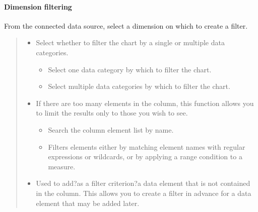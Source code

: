 \documentclass[letterpaper,10pt,english]{sphinxmanual}
\begin{document}
\paragraph{Dimension filtering}
\label{\detokenize{discovery/part04/chart_filter:id5}}
From the connected data source, select a dimension on which to create a filter.
\begin{quote}

\begin{figure}[H]
\centering

\noindent{}
\end{figure}
\begin{itemize}
\item {} 
 Select whether to filter the chart by a single or multiple data categories.
\begin{itemize}
\item {} 
 Select one data category by which to filter the chart.

\item {} 
 Select multiple data categories by which to filter the chart.

\end{itemize}

\item {} 
 If there are too many elements in the column, this function allows you to limit the results only to those you wish to see.
\begin{itemize}
\item {} 
 Search the column element list by name.

\item {} 
 Filters elements either by matching element names with regular expressions or wildcards, or by applying a range condition to a measure.

\end{itemize}

\end{itemize}

\begin{figure}[H]
\centering

\noindent{}
\end{figure}
\begin{itemize}
\item {} 
 Used to add?as a filter criterion?a data element that is not contained in the column. This allows you to create a filter in advance for a data element that may be added later.

\end{itemize}
\end{quote}
\end{document}
